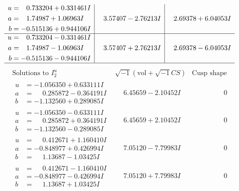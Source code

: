 \documentclass[1p]{elsarticle_modified}
\theoremstyle{definition}
\newcommand{\I}{\sqrt{-1}}
\begin{document}
$$\begin{array}{c|c|c}
\begin{aligned}
u &= \phantom{-}0.733204 + 0.331461 I \\
a &= \phantom{-}1.74987 + 1.06963 I \\
b &= -0.515136 + 0.944106 I\end{aligned}
 & \phantom{-}3.57407 - 2.76213 I & \phantom{-}2.69378 + 6.04053 I \\ \hline\begin{aligned}
u &= \phantom{-}0.733204 - 0.331461 I \\
a &= \phantom{-}1.74987 - 1.06963 I \\
b &= -0.515136 - 0.944106 I\end{aligned}
 & \phantom{-}3.57407 + 2.76213 I & \phantom{-}2.69378 - 6.04053 I\\
 \hline 
 \end{array}$$\newpage$$\begin{array}{c|c|c}  
\text{Solutions to }I^u_{2}& \I (\text{vol} + \sqrt{-1}CS) & \text{Cusp shape}\\
 \hline 
\begin{aligned}
u &= -1.056350 + 0.633111 I \\
a &= \phantom{-}0.285872 - 0.364191 I \\
b &= -1.132560 + 0.289085 I\end{aligned}
 & \phantom{-}6.45659 - 2.10452 I & \phantom{-0.000000 } 0 \\ \hline\begin{aligned}
u &= -1.056350 - 0.633111 I \\
a &= \phantom{-}0.285872 + 0.364191 I \\
b &= -1.132560 - 0.289085 I\end{aligned}
 & \phantom{-}6.45659 + 2.10452 I & \phantom{-0.000000 } 0 \\ \hline\begin{aligned}
u &= \phantom{-}0.412671 + 1.160410 I \\
a &= -0.848977 + 0.426994 I \\
b &= \phantom{-}1.13687 - 1.03425 I\end{aligned}
 & \phantom{-}7.05120 - 7.79983 I & \phantom{-0.000000 } 0 \\ \hline\begin{aligned}
u &= \phantom{-}0.412671 - 1.160410 I \\
a &= -0.848977 - 0.426994 I \\
b &= \phantom{-}1.13687 + 1.03425 I\end{aligned}
 & \phantom{-}7.05120 + 7.79983 I & \phantom{-0.000000 } 0 \\ \hline\begin{aligned}

\end{aligned}
\end{array}$$
\end{document}
